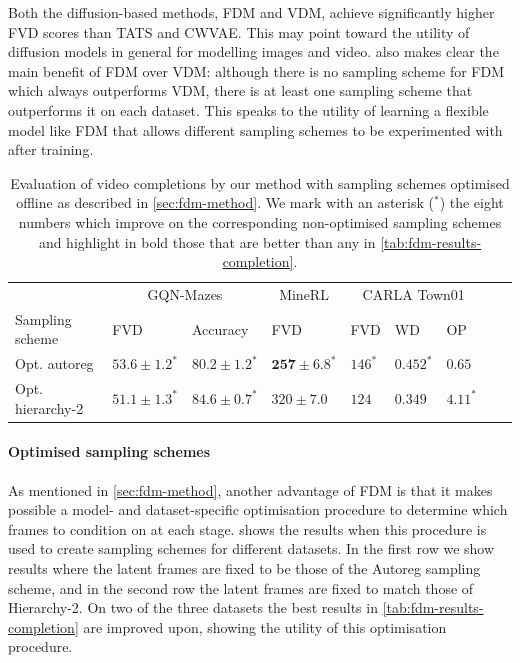 Both the diffusion-based methods, FDM and VDM, achieve significantly higher FVD scores than TATS and CWVAE. This may point toward the utility of diffusion models in general for modelling images and video.  also makes clear the main benefit of FDM over VDM: although there is no sampling scheme for FDM which always outperforms VDM, there is at least one sampling scheme that outperforms it on each dataset. This speaks to the utility of learning a flexible model like FDM that allows different sampling schemes to be experimented with after training.

\begin{table} %
  \small
  \caption{Evaluation of video completions by our method with sampling schemes optimised offline as described in \cref{sec:fdm-method}.  We mark with an asterisk ($^*$) the eight numbers which improve on the corresponding non-optimised sampling schemes and highlight in bold those that are better than any in \cref{tab:fdm-results-completion}.}
  \vspace{2mm}
  \label{tab:fdm-optimized}
  \centering
  \begin{tabular}{lllllllll}
    \toprule
     & \multicolumn{2}{c}{GQN-Mazes}  & \multicolumn{1}{c}{MineRL}  & \multicolumn{3}{c}{CARLA Town01} \\
    \cmidrule(r){2-3} \cmidrule(r){4-4} \cmidrule(r){5-7}
    Sampling scheme       & FVD     & Accuracy    &    FVD & FVD & WD & OP \\
    \midrule
    Opt. autoreg        & $53.6 \pm 1.2^*$            & $80.2 \pm 1.2^*$            & $\mathbf{257 \pm 6.8}^*$    &   $146^*$ & $0.452^*$ & $0.65$   \\
    Opt. hierarchy-2   & $\mathbf{51.1 \pm 1.3}^*$    & $\mathbf{84.6 \pm 0.7}^*$   & $320 \pm 7.0$    &   $124$ & $0.349$ & $4.11^*$   \\
    \bottomrule
  \end{tabular}
\end{table}

\paragraph{Optimised sampling schemes}
As mentioned in \cref{sec:fdm-method}, another advantage of FDM is that it makes possible a model- and dataset-specific optimisation procedure to determine which frames to condition on at each stage.  shows the results when this procedure is used to create sampling schemes for different datasets. In the first row we show results where the latent frames are fixed to be those of the Autoreg sampling scheme, and in the second row the latent frames are fixed to match those of Hierarchy-2. On two of the three datasets the best results in \cref{tab:fdm-results-completion} are improved upon, showing the utility of this optimisation procedure.


